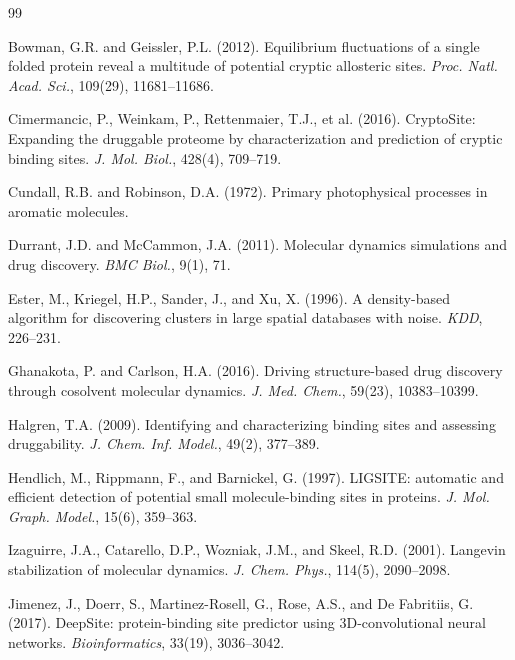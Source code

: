 \documentclass[11pt,twocolumn]{article}
\begin{document}
\begin{thebibliography}{99}

Bowman, G.R. and Geissler, P.L. (2012).
Equilibrium fluctuations of a single folded protein reveal a multitude of potential cryptic allosteric sites.
\textit{Proc. Natl. Acad. Sci.}, 109(29), 11681--11686.

Cimermancic, P., Weinkam, P., Rettenmaier, T.J., et al. (2016).
CryptoSite: Expanding the druggable proteome by characterization and prediction of cryptic binding sites.
\textit{J. Mol. Biol.}, 428(4), 709--719.

Cundall, R.B. and Robinson, D.A. (1972).
Primary photophysical processes in aromatic molecules.

Durrant, J.D. and McCammon, J.A. (2011).
Molecular dynamics simulations and drug discovery.
\textit{BMC Biol.}, 9(1), 71.

Ester, M., Kriegel, H.P., Sander, J., and Xu, X. (1996).
A density-based algorithm for discovering clusters in large spatial databases with noise.
\textit{KDD}, 226--231.

Ghanakota, P. and Carlson, H.A. (2016).
Driving structure-based drug discovery through cosolvent molecular dynamics.
\textit{J. Med. Chem.}, 59(23), 10383--10399.

Halgren, T.A. (2009).
Identifying and characterizing binding sites and assessing druggability.
\textit{J. Chem. Inf. Model.}, 49(2), 377--389.

Hendlich, M., Rippmann, F., and Barnickel, G. (1997).
LIGSITE: automatic and efficient detection of potential small molecule-binding sites in proteins.
\textit{J. Mol. Graph. Model.}, 15(6), 359--363.

Izaguirre, J.A., Catarello, D.P., Wozniak, J.M., and Skeel, R.D. (2001).
Langevin stabilization of molecular dynamics.
\textit{J. Chem. Phys.}, 114(5), 2090--2098.

Jimenez, J., Doerr, S., Martinez-Rosell, G., Rose, A.S., and De Fabritiis, G. (2017).
DeepSite: protein-binding site predictor using 3D-convolutional neural networks.
\textit{Bioinformatics}, 33(19), 3036--3042.


\end{thebibliography}
\end{document}
